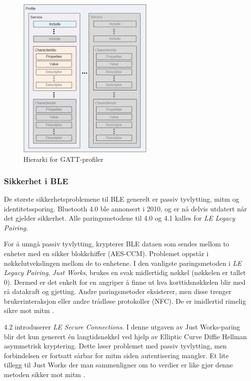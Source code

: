 \begin{figure}
\includegraphics[width=0.6\textwidth,center]{fig/gatt}
\caption{Hierarki for GATT-profiler} %
\label{fig:gatt}
\end{figure}

\subsubsection{Sikkerhet i BLE}
De største sikkerhetsproblemene til BLE generelt er passiv tyvlytting, \gls{mitm} og identitetssporing.
Bluetooth 4.0 ble annonsert i 2010, og er nå delvis utdatert når det gjelder sikkerhet. Alle paringsmetodene
til 4.0 og 4.1 kalles for \textit{LE Legacy Pairing}. 

For å unngå passiv tyvlytting, krypterer BLE dataen som sendes mellom to enheter med en sikker blokkchiffer (AES-CCM). Problemet oppstår
i nøkkelutvekslingen mellom de to enhetene. I den vanligste paringsmetoden i \textit{LE Legacy Pairing}, \textit{Just Works\texttrademark},
brukes en svak midlertidig nøkkel (nøkkelen er tallet 0). Dermed er det enkelt for en angriper å finne ut hva korttidsnøkkelen
blir med rå datakraft og gjetting. Andre paringsmetoder eksisterer, men disse trenger brukerinteraksjon eller andre trådløse protokoller (NFC).
De er imidlertid rimelig sikre mot \gls{mitm} \citep{eewiki_ble}.

4.2 introduserer \textit{LE Secure Connections}. I denne utgaven av Just Works\texttrademark-paring blir det kun generert
én langtidsnøkkel ved hjelp av Elliptic Curve Diffie Hellman asymmetrisk kryptering. Dette løser problemet med passiv
tyvlytting, men forbindelsen er fortsatt sårbar for \gls{mitm} siden autentisering mangler. Et lite tillegg til Just Works\texttrademark
der man sammenligner om to verdier er like gjør denne metoden sikker mot \gls{mitm} \citep{eewiki_ble}.

